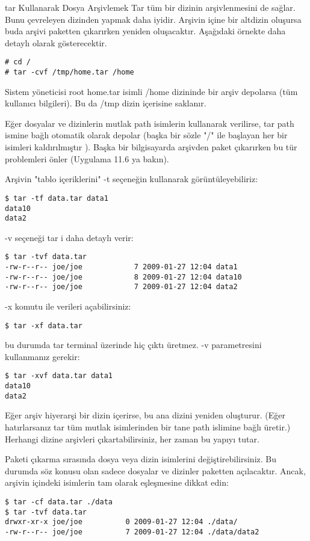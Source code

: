 \documentclass[10pt,a5paper]{book}
\begin{document}
\begin{section}{tar Kullanarak Dosya Arşivlemek}
Tar tüm bir dizinin arşivlenmesini de sağlar. Bunu çevreleyen dizinden yapmak daha iyidir. Arşivin içine bir altdizin oluşursa buda arşivi paketten çıkarırken yeniden oluşacaktır. Aşağıdaki örnekte daha detaylı olarak gösterecektir.
\begin{verbatim}
# cd /
# tar -cvf /tmp/home.tar /home
\end{verbatim}


Sistem yöneticisi root home.tar isimli /home dizininde bir arşiv depolarsa (tüm kullanıcı bilgileri). Bu da /tmp dizin içerisine saklanır.

Eğer dosyalar ve dizinlerin mutlak path isimlerin kullanarak verilirse, tar path
ismine bağlı otomatik olarak depolar (başka bir sözle "/" ile başlayan her bir
isimleri kaldırılmıştır ). Başka bir bilgisayarda arşivden paket çıkarırken bu tür
problemleri önler (Uygulama 11.6 ya bakın).

Arşivin "tablo içeriklerini" -t seçeneğin kullanarak görüntüleyebiliriz:
\begin{verbatim}
$ tar -tf data.tar data1
data10
data2
\end{verbatim}

-v seçeneği tar i daha detaylı verir:
\begin{verbatim}
$ tar -tvf data.tar
-rw-r--r-- joe/joe            7 2009-01-27 12:04 data1
-rw-r--r-- joe/joe            8 2009-01-27 12:04 data10
-rw-r--r-- joe/joe            7 2009-01-27 12:04 data2
\end{verbatim}

-x komutu ile verileri açabilirsiniz:
\begin{verbatim}
$ tar -xf data.tar
\end{verbatim}
bu durumda tar terminal üzerinde hiç çıktı üretmez. -v parametresini kullanmanız gerekir:
\begin{verbatim}
$ tar -xvf data.tar data1
data10
data2
\end{verbatim}

Eğer arşiv hiyerarşi bir dizin içerirse, bu ana dizini yeniden oluşturur. (Eğer hatırlarsanız tar tüm mutlak isimlerinden bir tane path islimine bağlı üretir.) Herhangi dizine arşivleri çıkartabilirsiniz, her zaman bu yapıyı tutar.

Paketi çıkarma sırasında dosya veya dizin isimlerini değiştirebilirsiniz. Bu durumda söz konusu olan sadece dosyalar ve dizinler paketten açılacaktır. Ancak, arşivin içindeki isimlerin tam olarak eşleşmesine dikkat edin:
\begin{verbatim}
$ tar -cf data.tar ./data 
$ tar -tvf data.tar
drwxr-xr-x joe/joe          0 2009-01-27 12:04 ./data/
-rw-r--r-- joe/joe          7 2009-01-27 12:04 ./data/data2


\end{verbatim}
\end{section}
\end{document}
